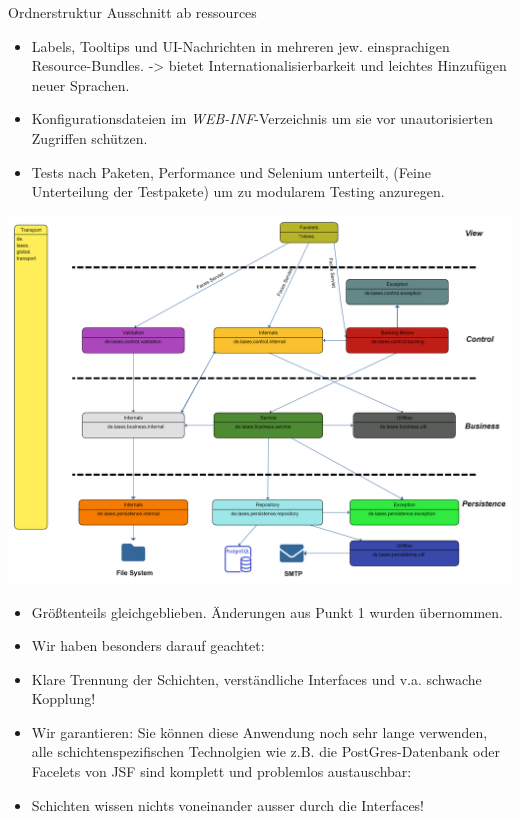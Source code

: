 \documentclass{beamer}
\begin{document}
\begin{frame}{Ordnerstruktur}
        Ausschnitt ab ressources
        \begin{itemize}
            \item Labels, Tooltips und UI-Nachrichten in mehreren jew. einsprachigen Resource-Bundles.
            -> bietet Internationalisierbarkeit und leichtes Hinzufügen neuer Sprachen.
            \pause
            \item Konfigurationsdateien im \emph{WEB-INF}-Verzeichnis um sie vor unautorisierten
            Zugriffen schützen.
            \pause
            \item Tests nach Paketen, Performance und Selenium unterteilt, (Feine Unterteilung der Testpakete)
            um zu modularem Testing anzuregen.
        \end{itemize}
        \pause
        \centering
        \includegraphics[height=1.1\textheight]{graphics/Paketdiagramm (15)}
        \begin{itemize}
            \item Größtenteils gleichgeblieben. Änderungen aus Punkt 1 wurden übernommen.
            \item Wir haben besonders darauf geachtet:
            \item Klare Trennung der Schichten, verständliche Interfaces und v.a. schwache Kopplung!
            \item Wir garantieren: Sie können diese Anwendung noch sehr lange verwenden,
            alle schichtenspezifischen Technolgien wie z.B. die PostGres-Datenbank
            oder Facelets von JSF sind komplett und problemlos austauschbar:
            \item Schichten wissen nichts voneinander ausser durch die Interfaces!
        \end{itemize}
    \end{frame}
\end{document}
